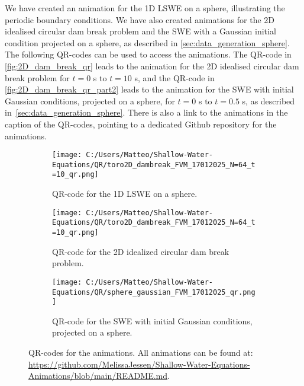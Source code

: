 We have created an animation for the 1D LSWE on a sphere, illustrating the periodic boundary conditions. 
We have also created animations for the 2D idealised circular dam break problem and the SWE with a Gaussian initial condition projected on a sphere, as described in \autoref{sec:data_generation_sphere}.
The following QR-codes can be used to access the animations.
The QR-code in \autoref{fig:2D_dam_break_qr} leads to the animation for the 2D idealised circular dam break problem for $t=0$ s to $t = 10$ s,
and the QR-code in \autoref{fig:2D_dam_break_qr_part2} leads to the animation for the SWE with initial Gaussian conditions, projected on a sphere, for $t=0$ s to $t = 0.5$ s, as described in~\autoref{sec:data_generation_sphere}.
There is also a link to the animations in the caption of the QR-codes, pointing to a dedicated Github repository for the animations.
\begin{figure}[H]
    \centering
    \begin{subfigure}{0.25\textwidth}
        \begin{minipage}[t]{\textwidth}
            \centering
            \texttt{[image: C:/Users/Matteo/Shallow-Water-Equations/QR/toro2D\_dambreak\_FVM\_17012025\_N=64\_t=10\_qr.png]}
            \caption{QR-code for the 1D LSWE on a sphere.}\label{fig:1D_LSWE_sphere_qr}
        \end{minipage}
    \end{subfigure}
    \hspace{1cm}
    \begin{subfigure}{0.25\textwidth}
        \begin{minipage}[t]{\textwidth}
            \centering
            \texttt{[image: C:/Users/Matteo/Shallow-Water-Equations/QR/toro2D\_dambreak\_FVM\_17012025\_N=64\_t=10\_qr.png]}
            \caption{QR-code for the 2D idealized circular dam break problem.}\label{fig:2D_dam_break_qr}
        \end{minipage}
    \end{subfigure}
    \hspace{1cm}
    \begin{subfigure}{0.25\textwidth}
        \begin{minipage}[t]{\textwidth}
            \centering
            \texttt{[image: C:/Users/Matteo/Shallow-Water-Equations/QR/sphere\_gaussian\_FVM\_17012025\_qr.png]}
            \caption{QR-code for the SWE with initial Gaussian conditions, projected on a sphere.}\label{fig:2D_dam_break_qr_part2}
        \end{minipage}
    \end{subfigure}
    \caption{QR-codes for the animations.
            All animations can be found at: \url{https://github.com/MelissaJessen/Shallow-Water-Equations-Animations/blob/main/README.md}.}\label{fig:2D_dam_break_qr_all}
\end{figure}


